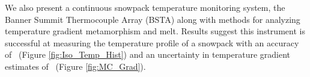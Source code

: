We also present a continuous snowpack temperature monitoring system, the Banner Summit Thermocouple Array (BSTA) along with methods for analyzing temperature gradient metamorphism and melt. Results suggest this instrument is successful at measuring the temperature profile of a snowpack with an accuracy of \isostd \ (Figure \ref{fig:Iso_Temp_Hist}) and an uncertainty in temperature gradient estimates of \gradstd \ (Figure \ref{fig:MC_Grad}).
